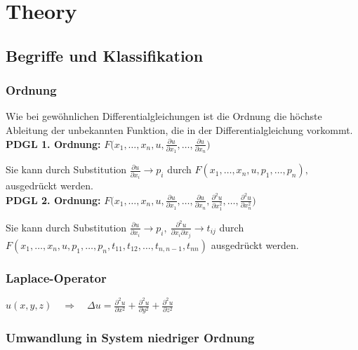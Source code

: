 \section{Theory}

\subsection{Begriffe und Klassifikation}

\subsubsection{Ordnung}

Wie bei gewöhnlichen Differentialgleichungen ist die Ordnung
die höchste Ableitung der unbekannten Funktion, die in der
Differentialgleichung vorkommt.\\

\textbf{PDGL 1. Ordnung: } \qquad$F\biggl(x_1,\dots,x_n, u, \frac{\partial u}{\partial x_1},\dots,\frac{\partial u}{\partial x_n}\biggr)$

Sie kann durch Substitution $\frac{\partial u}{\partial x_i}\to p_i$ durch  $F(x_1,\dots,x_n,u,p_1,\dots,p_n),$
ausgedrückt werden.\\

\textbf{PDGL 2. Ordnung: } \qquad $F\biggl(x_1,\dots,x_n,u,
\frac{\partial u}{\partial x_1},\dots,\frac{\partial u}{\partial x_n},
\frac{\partial^2 u}{\partial x_1^2},\dots,\frac{\partial^2 u}{\partial x_n^2}\biggr)$

Sie kann durch Substitution $\frac{\partial u}{\partial x_i}\to p_i,~\frac{\partial^2 u}{\partial x_i\partial x_j}\to t_{ij}$ durch
$F(x_1,\dots,x_n,u,p_1,\dots,p_n,t_{11},t_{12},\dots,t_{n,n-1},t_{nn})$
ausgedrückt werden.

\subsubsection{Laplace-Operator}
$u(x,y,z)\quad\Rightarrow\quad \Delta u=\frac{\partial^2u}{\partial x^2}+\frac{\partial^2u}{\partial y^2}+\frac{\partial^2u}{\partial z^2}$

\subsubsection{Umwandlung in System niedriger Ordnung}


